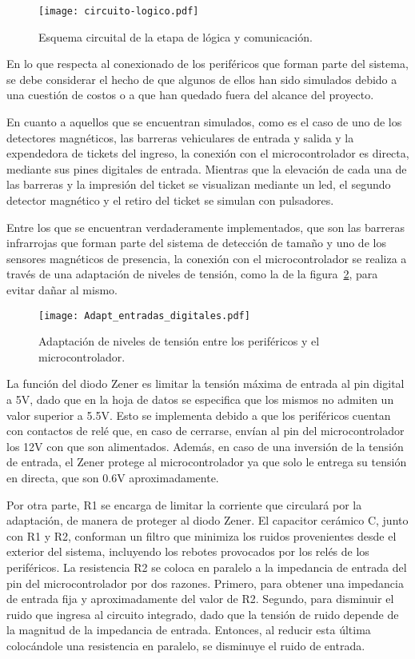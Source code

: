 \begin{figure}[H]
	\centering
	\texttt{[image: circuito-logico.pdf]}
	\caption{Esquema circuital de la etapa de lógica y comunicación.}
	\label{fig:img_circuito_logico}
\end{figure}

En lo que respecta al conexionado de los periféricos que forman parte del sistema, se debe considerar el hecho de que algunos de ellos han sido simulados debido a una cuestión de costos o a que han quedado fuera del alcance del proyecto.

En cuanto a aquellos que se encuentran simulados, como es el caso de uno de los detectores magnéticos, las barreras vehiculares de entrada y salida y la expendedora de tickets del ingreso, la conexión con el microcontrolador es directa, mediante sus pines digitales de entrada. Mientras que la elevación de cada una de las barreras y la impresión del ticket se visualizan mediante un led, el segundo detector magnético y el retiro del ticket se simulan con pulsadores. 

Entre los que se encuentran verdaderamente implementados, que son las barreras infrarrojas que forman parte del sistema de detección de tamaño y uno de los sensores magnéticos de presencia, la conexión con el microcontrolador se realiza a través de una adaptación de niveles de tensión, como la de la figura~\ref{fig:img_Adapt_entradas_digitales}, para evitar dañar al mismo.

\begin{figure}[H]
	\centering
	\texttt{[image: Adapt\_entradas\_digitales.pdf]}
	\caption{Adaptación de niveles de tensión entre los periféricos y el microcontrolador.}
	\label{fig:img_Adapt_entradas_digitales}
\end{figure}

La función del diodo Zener es limitar la tensión máxima de entrada al pin digital a 5V, dado que en la hoja de datos se especifica que los mismos no admiten un valor superior a 5.5V. Esto se implementa debido a que los periféricos cuentan con contactos de relé que, en caso de cerrarse, envían al pin del microcontrolador los 12V con que son alimentados. Además, en caso de una inversión de la tensión de entrada, el Zener protege al microcontrolador ya que solo le entrega su tensión en directa, que son 0.6V aproximadamente.

Por otra parte, R1 se encarga de limitar la corriente que circulará por la adaptación, de manera de proteger al diodo Zener. El capacitor cerámico C, junto con R1 y R2, conforman un filtro que minimiza los ruidos provenientes desde el exterior del sistema, incluyendo los rebotes provocados por los relés de los periféricos. La resistencia R2 se coloca en paralelo a la impedancia de entrada del pin del microcontrolador por dos razones. Primero, para obtener una impedancia de entrada fija y aproximadamente del valor de R2. Segundo, para disminuir el ruido que ingresa al circuito integrado, dado que la tensión de ruido depende de la magnitud de la impedancia de entrada. Entonces, al reducir esta última colocándole una resistencia en paralelo, se disminuye el ruido de entrada.

